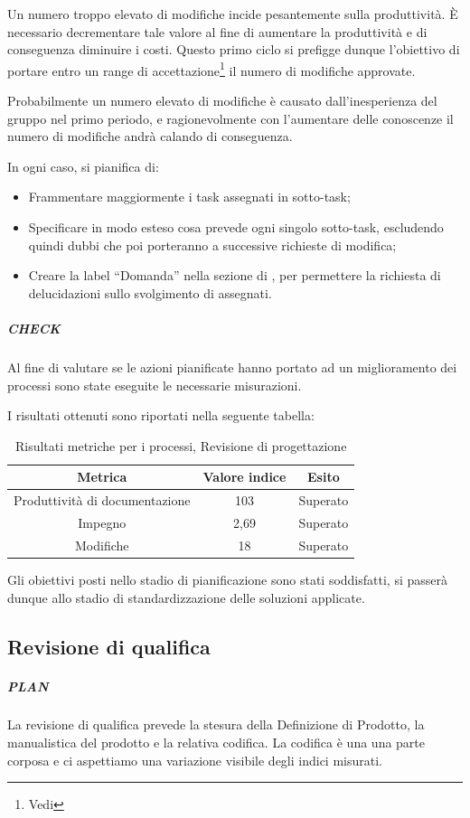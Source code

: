 Un numero troppo elevato di modifiche incide pesantemente sulla produttività. È necessario decrementare tale valore al fine di aumentare la produttività e di conseguenza diminuire i costi. Questo primo ciclo  si prefigge dunque l'obiettivo di portare entro un range di accettazione\footnote{Vedi \PianoDiQualifica} il numero di modifiche approvate.

Probabilmente un numero elevato di modifiche è causato dall'inesperienza del gruppo nel primo periodo, e ragionevolmente con l'aumentare delle conoscenze il numero di modifiche andrà calando di conseguenza. 

In ogni caso, si pianifica di:
\begin{itemize}
\item Frammentare maggiormente i task assegnati in sotto-task;
\item Specificare in modo esteso cosa prevede ogni singolo sotto-task, escludendo quindi dubbi che poi porteranno a successive richieste di modifica;
\item Creare la label ``Domanda'' nella sezione  di , per permettere la richiesta di delucidazioni sullo svolgimento di  assegnati.
\end{itemize}
  
\subparagraph{CHECK}

Al fine di valutare se le azioni pianificate hanno portato ad un miglioramento dei processi sono state eseguite le necessarie misurazioni.

I risultati ottenuti sono riportati nella seguente tabella:
\begin{table}[H]
\centering
\begin{tabular}{ | c | c | c | }
\hline
\textbf{Metrica} & \textbf{Valore indice} & \textbf{Esito} \\
\hline
Produttività di documentazione & 103 & Superato \\
\hline
Impegno & 2,69 & Superato \\
\hline
Modifiche & 18 & Superato \\
\hline
\end{tabular}
\caption{Risultati metriche per i processi, Revisione di progettazione}
\end{table}

Gli obiettivi posti nello stadio di pianificazione sono stati soddisfatti, si passerà dunque allo stadio di standardizzazione delle soluzioni applicate.


\newpage
\subsection{Revisione di qualifica}
	\subparagraph{PLAN}
	La revisione di qualifica prevede la stesura della Definizione di Prodotto, la manualistica del prodotto e la relativa codifica. La codifica è una una parte corposa e ci aspettiamo una variazione visibile degli indici misurati.

